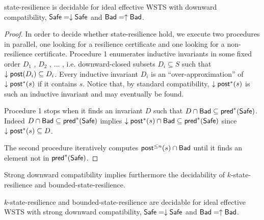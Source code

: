 \begin{theorem}\label{downward srp}
{\sc state-resilience} is decidable for ideal effective WSTS with downward compatibility,
$\textsf{Safe} = \downarrow \textsf{Safe}$ and $\textsf{Bad} = \uparrow \textsf{Bad}$.
\end{theorem}

\begin{proof}
In order to decide whether state-resilience hold, we execute two procedures in parallel,
one looking for a resilience certificate and one looking for a non-resilience certificate.
Procedure 1 enumerates inductive invariants in some fixed order $D_1$ , $D_2$ , $\ldots$ , i.e. downward-closed subsets $D_i \subseteq S$ such that $\downarrow \textsf{post}(D_i ) \subseteq D_i$. 
Every inductive invariant $D_i$ is an “over-approximation” of $\downarrow \textsf{post}^*(s)$ if it contains $s$.
Notice that, by standard compatibility, $\downarrow \textsf{post}^*(s)$ is such an inductive invariant and may eventually be found.

Procedure 1 stops when it finds an invariant $D$ such that
$D  \cap \textsf{Bad} \subseteq \textsf{pred}^*(\textsf{Safe})$. 
Indeed
$D  \cap \textsf{Bad} \subseteq  \textsf{pred}^*(\textsf{Safe})$ implies
$\downarrow \textsf{post}^*(s) \cap \textsf{Bad} \subseteq  \textsf{pred}^*(\textsf{Safe})$
since $ \downarrow \textsf{post}^*(s)  \subseteq D$.

The second procedure iteratively computes
$\textsf{post}^{\leq n}(s) \cap \textsf{Bad}$
until it finds an element
not in $\textsf{pred}^*(\textsf{Safe})$.
\end{proof}



Strong downward compatibility implies furthermore the decidability
of {\sc $k$-state-resilience} and {\sc bounded-state-resilience}.

\begin{proposition}\label{downward brp}
{\sc $k$-state-resilience} and {\sc bounded-state-resilience} are decidable for ideal effective WSTS with strong downward compatibility,
$\textsf{Safe} = \downarrow \textsf{Safe}$ and $\textsf{Bad} = \uparrow \textsf{Bad}$.
\end{proposition}




